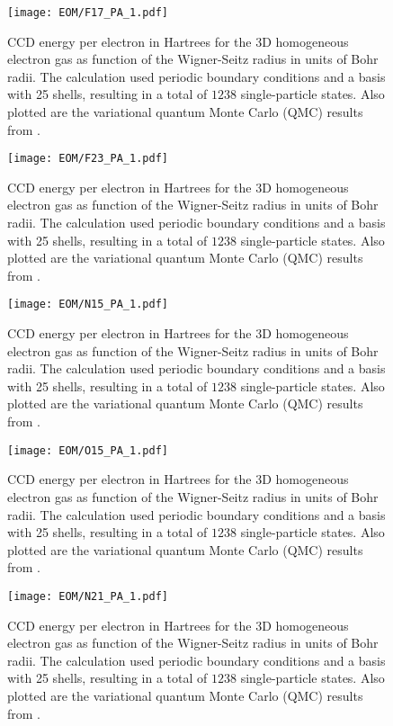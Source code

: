 \documentclass[thesis.tex]{subfiles}
\begin{document}
\begin{figure}[h]
  \texttt{[image: EOM/F17\_PA\_1.pdf]}
  \caption{CCD energy per electron in Hartrees for the 3D homogeneous electron gas as function of the Wigner-Seitz radius in units of Bohr radii. The calculation used periodic boundary conditions and a basis with 25 shells, resulting in a total of $1238$ single-particle states. Also plotted are the variational quantum Monte Carlo (QMC) results from \cite{LOPEZ2006}.}
  \label{fig:QDground}
\end{figure}

\begin{figure}[h]
  \texttt{[image: EOM/F23\_PA\_1.pdf]}
  \caption{CCD energy per electron in Hartrees for the 3D homogeneous electron gas as function of the Wigner-Seitz radius in units of Bohr radii. The calculation used periodic boundary conditions and a basis with 25 shells, resulting in a total of $1238$ single-particle states. Also plotted are the variational quantum Monte Carlo (QMC) results from \cite{LOPEZ2006}.}
  \label{fig:QDground}
\end{figure}

\begin{figure}[h]
  \texttt{[image: EOM/N15\_PA\_1.pdf]}
  \caption{CCD energy per electron in Hartrees for the 3D homogeneous electron gas as function of the Wigner-Seitz radius in units of Bohr radii. The calculation used periodic boundary conditions and a basis with 25 shells, resulting in a total of $1238$ single-particle states. Also plotted are the variational quantum Monte Carlo (QMC) results from \cite{LOPEZ2006}.}
  \label{fig:QDground}
\end{figure}

\begin{figure}[h]
  \texttt{[image: EOM/O15\_PA\_1.pdf]}
  \caption{CCD energy per electron in Hartrees for the 3D homogeneous electron gas as function of the Wigner-Seitz radius in units of Bohr radii. The calculation used periodic boundary conditions and a basis with 25 shells, resulting in a total of $1238$ single-particle states. Also plotted are the variational quantum Monte Carlo (QMC) results from \cite{LOPEZ2006}.}
  \label{fig:QDground}
\end{figure}

\begin{figure}[h]
  \texttt{[image: EOM/N21\_PA\_1.pdf]}
  \caption{CCD energy per electron in Hartrees for the 3D homogeneous electron gas as function of the Wigner-Seitz radius in units of Bohr radii. The calculation used periodic boundary conditions and a basis with 25 shells, resulting in a total of $1238$ single-particle states. Also plotted are the variational quantum Monte Carlo (QMC) results from \cite{LOPEZ2006}.}
  \label{fig:QDground}
\end{figure}
\end{document}
